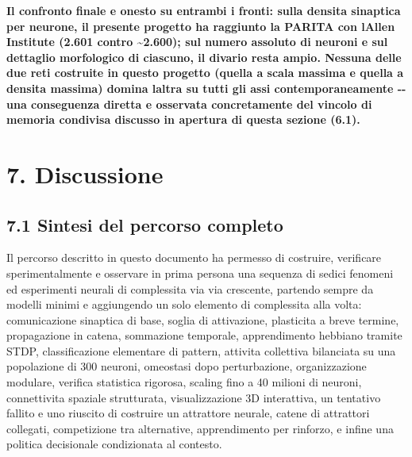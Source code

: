 \documentclass[
  italian,
]{article}
\begin{document}
\textbf{Il confronto finale e\textquotesingle{} onesto su entrambi i fronti: sulla densita\textquotesingle{} sinaptica per neurone, il presente progetto ha raggiunto la PARITA\textquotesingle{} con l\textquotesingle Allen Institute (2.601 contro \textasciitilde2.600); sul numero assoluto di neuroni e sul dettaglio morfologico di ciascuno, il divario resta ampio. Nessuna delle due reti costruite in questo progetto (quella a scala massima e quella a densita\textquotesingle{} massima) domina l\textquotesingle altra su tutti gli assi contemporaneamente -\/- una conseguenza diretta e osservata concretamente del vincolo di memoria condivisa discusso in apertura di questa sezione (6.1).}

\section{7. Discussione}\label{discussione}

\subsection{7.1 Sintesi del percorso completo}\label{sintesi-del-percorso-completo}

Il percorso descritto in questo documento ha permesso di costruire, verificare sperimentalmente e osservare in prima persona una sequenza di sedici fenomeni ed esperimenti neurali di complessita\textquotesingle{} via via crescente, partendo sempre da modelli minimi e aggiungendo un solo elemento di complessita\textquotesingle{} alla volta: comunicazione sinaptica di base, soglia di attivazione, plasticita\textquotesingle{} a breve termine, propagazione in catena, sommazione temporale, apprendimento hebbiano tramite STDP, classificazione elementare di pattern, attivita\textquotesingle{} collettiva bilanciata su una popolazione di 300 neuroni, omeostasi dopo perturbazione, organizzazione modulare, verifica statistica rigorosa, scaling fino a 40 milioni di neuroni, connettivita\textquotesingle{} spaziale strutturata, visualizzazione 3D interattiva, un tentativo fallito e uno riuscito di costruire un attrattore neurale, catene di attrattori collegati, competizione tra alternative, apprendimento per rinforzo, e infine una politica decisionale condizionata al contesto.
\end{document}
